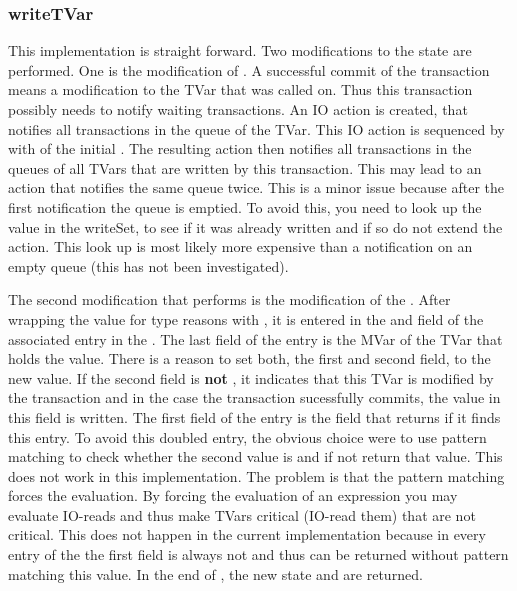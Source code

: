 \subsubsection{writeTVar}
This implementation is straight forward. Two modifications to the state are performed. One is
the modification of . A successful commit of the transaction means a 
modification to the TVar that  was called on. Thus this transaction 
possibly needs to notify waiting transactions. An IO action is created, that notifies
all transactions in the queue of the TVar. This IO action is sequenced by \code{>>} with 
 of the initial . The resulting action then notifies all transactions in the queues of all
TVars that are written by this transaction. This may lead to an action that notifies the 
same queue twice. This is a minor issue because after the first notification the queue 
is emptied. To avoid this, you need to look up the value in the writeSet, to see if 
it was already written and if so do not extend the  action. This look up
is most likely more expensive than a notification on an empty queue (this has not been 
investigated). 

The second modification that  performs is the modification of the .
After wrapping the value for type reasons with , it is entered in the  and  
field of the associated entry in the . The last field of the entry is the MVar of
the TVar that holds the value. There is a reason to set both, the first and second field, to the
new value. If the second field is \textbf{not} , it indicates that this TVar is modified 
by the transaction and in the case the transaction sucessfully commits, the value in this field
is written. The first field of the entry is the field that  returns if it finds
this entry. To avoid this doubled entry, the obvious choice were to use pattern matching to 
check whether the second value is  and if not return that value. This does not
work in this implementation. The problem is that the pattern matching forces the evaluation.
By forcing the evaluation of an expression you may evaluate IO-reads and thus make TVars critical (IO-read them)
that are not critical. This does not happen in the current implementation because in every entry
of the  the first field is always not  and thus can be returned
without pattern matching this value. 
In the end of , the new state and \code{()} are returned.

